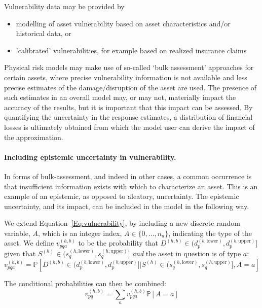 \documentclass[a4paper,11pt]{extarticle} %
\theoremstyle{definition}
\begin{document}
Vulnerability data may be provided by
\begin{itemize}
    \item modelling of asset vulnerability based on asset characteristics and/or historical data, or
    \item 'calibrated' vulnerabilities, for example based on realized insurance claims
\end{itemize}
Physical risk models may make use of so-called `bulk assessment' approaches for certain assets, where precise vulnerability information is not available and less precise estimates of the damage/disruption of the asset are used. The presence of such estimates in an overall model may, or may not, materially impact the accuracy of the results, but it is important that this impact can be assessed. By quantifying the uncertainty in the response estimates, a distribution of financial losses is ultimately obtained from which the model user can derive the impact of the approximation.

\paragraph{Including epistemic uncertainty in vulnerability.}
In forms of bulk-assessment, and indeed in other cases, a common occurrence is that insufficient information exists with which to characterize an asset. This is an example of an epistemic, as opposed to aleatory, uncertainty. The epistemic uncertainty, and its impact, can be included in the model in the following way.

We extend Equation~\ref{Eq:vulnerability}, by including a new discrete random variable, $A$, which is an integer index, $A \in \{0, ..., n_a\}$, indicating the type of the asset. We define $v^{(h, b)}_{pqa}$ to be the probability that $D^{(h, b)} \in (d^{(b,\text{lower})}_p, d^{(b,\text{upper})}_p]$ given that $S^{(h)} \in (s^{(h, \text{lower})}_q, s^{(h, \text{upper})}_q]$ \emph{and} the asset in question is of type $a$:
\begin{equation}
    \label{Eq:spistemic1}
    v^{(h, b)}_{pqa} = \mathbb{P} \left[ D^{(h, b)} \in (d^{(b,\text{lower})}_p, d^{(b,\text{upper})}_p] | S^{(h)} \in (s^{(h, \text{lower})}_q, s^{(h, \text{upper})}_q], A = a \right]
\end{equation}

The conditional probabilities can then be combined:
\begin{equation}
    \label{Eq:epistemic2}
    v^{(h, b)}_{pq} = \sum_a v^{(h, b)}_{pqa}  \mathbb{P}[A = a]
\end{equation}
\end{document}
